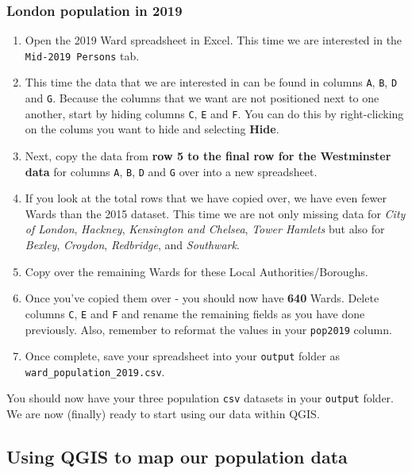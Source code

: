 \documentclass[
]{book}
\providecommand{\tightlist}{%
  \setlength{\itemsep}{0pt}\setlength{\parskip}{0pt}}
\begin{document}
\hypertarget{london-population-in-2019}{%
\subsubsection{London population in 2019}\label{london-population-in-2019}}

\begin{enumerate}
\def\labelenumi{\arabic{enumi}.}
\tightlist
\item
  Open the 2019 Ward spreadsheet in Excel. This time we are interested in the \texttt{Mid-2019\ Persons} tab.
\item
  This time the data that we are interested in can be found in columns \texttt{A}, \texttt{B}, \texttt{D} and \texttt{G}. Because the columns that we want are not positioned next to one another, start by hiding columns \texttt{C}, \texttt{E} and \texttt{F}. You can do this by right-clicking on the colums you want to hide and selecting \textbf{Hide}.
\item
  Next, copy the data from \textbf{row 5 to the final row for the Westminster data} for columns \texttt{A}, \texttt{B}, \texttt{D} and \texttt{G} over into a new spreadsheet.
\item
  If you look at the total rows that we have copied over, we have even fewer Wards than the 2015 dataset. This time we are not only missing data for \emph{City of London}, \emph{Hackney}, \emph{Kensington and Chelsea}, \emph{Tower Hamlets} but also for \emph{Bexley}, \emph{Croydon}, \emph{Redbridge}, and \emph{Southwark}.
\item
  Copy over the remaining Wards for these Local Authorities/Boroughs.
\item
  Once you've copied them over - you should now have \textbf{640} Wards. Delete columns \texttt{C}, \texttt{E} and \texttt{F} and rename the remaining fields as you have done previously. Also, remember to reformat the values in your \texttt{pop2019} column.
\item
  Once complete, save your spreadsheet into your \texttt{output} folder as \texttt{ward\_population\_2019.csv}.
\end{enumerate}

You should now have your three population \texttt{csv} datasets in your \texttt{output} folder. We are now (finally) ready to start using our data within QGIS.

\hypertarget{using-qgis-to-map-our-population-data}{%
\subsection{Using QGIS to map our population data}\label{using-qgis-to-map-our-population-data}}
\end{document}
